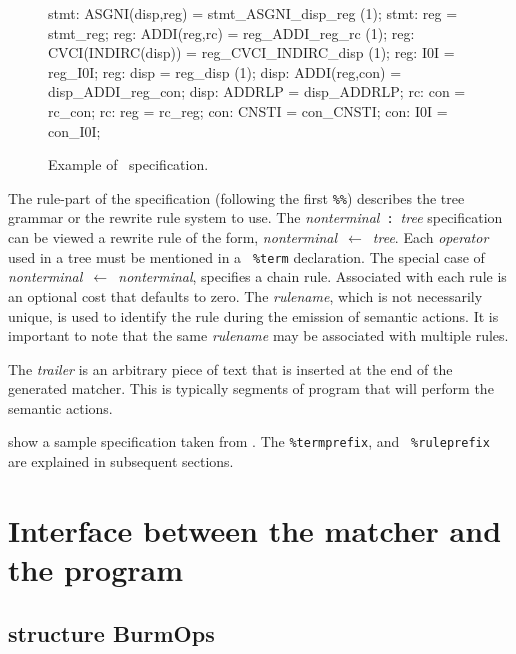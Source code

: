 \documentclass[11pt]{article}
\begin{document}
\begin{figure}
\small
\begin{centercode}
stmt:   ASGNI(disp,reg)         = stmt_ASGNI_disp_reg   (1);
stmt:   reg                     = stmt_reg;
reg:    ADDI(reg,rc)            = reg_ADDI_reg_rc       (1);
reg:    CVCI(INDIRC(disp))      = reg_CVCI_INDIRC_disp  (1);
reg:    I0I                     = reg_I0I;
reg:    disp                    = reg_disp              (1);
disp:   ADDI(reg,con)           = disp_ADDI_reg_con;
disp:   ADDRLP                  = disp_ADDRLP;
rc:     con                     = rc_con;
rc:     reg                     = rc_reg;
con:    CNSTI                   = con_CNSTI;
con:    I0I                     = con_I0I;
\end{centercode}
 \caption{Example of \mlburg\ specification.}
 \label{f:ex_spec}
\end{figure}

The rule-part of the specification (following the first {\tt \%\%})
describes the tree grammar or the rewrite rule system to use. The 
\mbox{{\sl nonterminal} {\tt :} {\it tree}} specification can be viewed a
rewrite rule of the form, \mbox{{\sl nonterminal} $\leftarrow$ {\it tree}}.
Each {\sl operator} used in a tree must be mentioned in a {\tt
\%term} declaration. The special case of \mbox{\sl nonterminal
$\leftarrow$ nonterminal}, specifies a chain rule. Associated with
each rule is an optional cost that defaults to zero. The {\sl
rulename}, which is not necessarily unique, is used to identify the
rule during the emission of semantic actions. It is important to note
that the same {\sl rulename} may be associated with multiple rules.

The {\sl trailer} is an arbitrary piece of text that is inserted at
the end of the generated matcher. This is typically segments of
program that will perform the semantic actions.

 show a sample specification taken from
\cite{fraser-hanson-proebsting-92}. The {\tt \%termprefix}, and {\tt
\%ruleprefix} are explained in subsequent sections.


		\section{Interface between the matcher and the program}

	\subsection{structure BurmOps}
\end{document}

